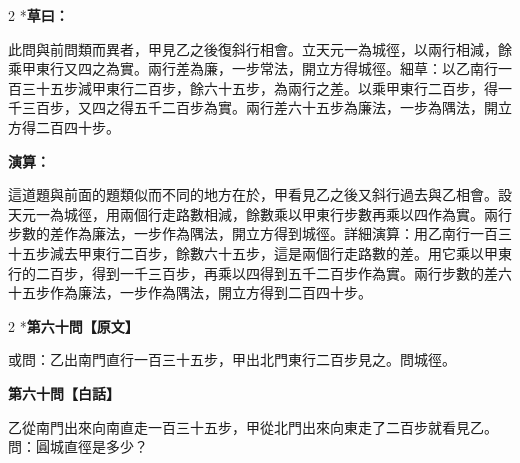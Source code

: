\documentclass[11pt,a4paper]{article}
\begin{document}
\begin{paracol}{2}
\switchcolumn[0]*\textbf{草曰：}

\small 此問與前問類而異者，甲見乙之後復斜行相會。立天元一為城徑，以兩行相減，餘乘甲東行又四之為實。兩行差為廉，一步常法，開立方得城徑。細草：以乙南行一百三十五步減甲東行二百步，餘六十五步，為兩行之差。以乘甲東行二百步，得一千三百步，又四之得五千二百步為實。兩行差六十五步為廉法，一步為隅法，開立方得二百四十步。

\switchcolumn\textbf{演算：}

\small 這道題與前面的題類似而不同的地方在於，甲看見乙之後又斜行過去與乙相會。設天元一為城徑，用兩個行走路數相減，餘數乘以甲東行步數再乘以四作為實。兩行步數的差作為廉法，一步作為隅法，開立方得到城徑。詳細演算：用乙南行一百三十五步減去甲東行二百步，餘數六十五步，這是兩個行走路數的差。用它乘以甲東行的二百步，得到一千三百步，再乘以四得到五千二百步作為實。兩行步數的差六十五步作為廉法，一步作為隅法，開立方得到二百四十步。
\end{paracol}

\vspace{0.1cm}
\noindent{}
\par\vspace{0.3cm}

\begin{paracol}{2}
\switchcolumn[0]*\noindent\textbf{第六十問【原文】}

\small 或問：乙出南門直行一百三十五步，甲出北門東行二百步見之。問城徑。

\switchcolumn\noindent\textbf{第六十問【白話】}

\small 乙從南門出來向南直走一百三十五步，甲從北門出來向東走了二百步就看見乙。問：圓城直徑是多少？
\end{paracol}

\vspace{0.1cm}
\noindent{}
\par\vspace{0.15cm}
\end{document}
